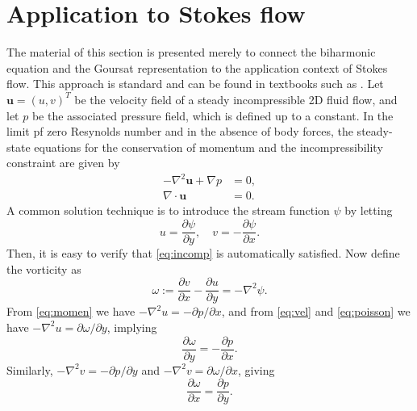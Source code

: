 \documentclass{article}
\renewcommand{\vec}[1]{\mathbf{#1}}
\begin{document}
\section{Application to Stokes flow \label{sec:physics}}

The material of this section is presented merely to connect the biharmonic
equation and the Goursat representation to the application context of Stokes
flow. This approach is standard and can be found in textbooks such as
\cite{ockendon95}. Let $\vec{u}=(u,v)^T$ be the velocity field of a steady
incompressible 2D fluid flow, and let $p$ be the associated pressure field,
which is defined up to a constant. In the limit pf zero Resynolds number and in
the absence of body forces, the steady-state equations for the conservation of
momentum and the incompressibility constraint are given by
\begin{subequations}\label{eq:stokes}
\begin{align}
-\nabla^2 \vec{u} + \nabla p &= 0,\label{eq:momen}\\
\nabla\cdot\vec{u} &= 0. \label{eq:incomp}
\end{align}
\end{subequations}
A common solution technique is to introduce the stream function $\psi$ by letting
\begin{equation}\label{eq:vel}
u=\frac{\partial\psi}{\partial y}, \quad 
v=-\frac{\partial\psi}{\partial x}.
\end{equation}
Then, it is easy to verify that \eqref{eq:incomp} is automatically satisfied.
Now define the vorticity as
\begin{equation} \label{eq:poisson}
\omega := \frac{\partial v}{\partial x} - \frac{\partial u}{\partial y}  = -\nabla^2 \psi.
\end{equation}
From \eqref{eq:momen} we have $-\nabla^2 u = -\partial p/\partial x$, and from
\eqref{eq:vel} and \eqref{eq:poisson} we have $-\nabla^2 u
=\partial\omega/\partial y$, implying 
\begin{equation}
\frac{\partial \omega}{\partial y} = -\frac{\partial p}{\partial x}.
\end{equation}
Similarly, $-\nabla^2 v=-\partial p/\partial y$ and $-\nabla^2 v =\partial
\omega/\partial x$, giving
\begin{equation}
\frac{\partial\omega}{\partial x}=\frac{\partial p}{\partial y}.
\end{equation}
\end{document}

